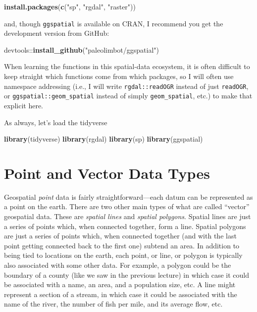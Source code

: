 \documentclass[]{book}
\newenvironment{Shaded}{\begin{snugshade}}{\end{snugshade}}
\newcommand{\KeywordTok}[1]{\textcolor[rgb]{0.13,0.29,0.53}{\textbf{{#1}}}}
\newcommand{\StringTok}[1]{\textcolor[rgb]{0.31,0.60,0.02}{{#1}}}
\newcommand{\NormalTok}[1]{{#1}}
\theoremstyle{definition}
\theoremstyle{definition}
\theoremstyle{remark}
\begin{document}
\begin{Shaded}
\begin{Highlighting}[]
\KeywordTok{install.packages}\NormalTok{(}\KeywordTok{c}\NormalTok{(}\StringTok{"sp"}\NormalTok{, }\StringTok{"rgdal"}\NormalTok{, }\StringTok{"raster"}\NormalTok{))}
\end{Highlighting}
\end{Shaded}

and, though \texttt{ggspatial} is available on CRAN, I recommend you get
the development version from GitHub:

\begin{Shaded}
\begin{Highlighting}[]
\NormalTok{devtools::}\KeywordTok{install_github}\NormalTok{(}\StringTok{"paleolimbot/ggspatial"}\NormalTok{)}
\end{Highlighting}
\end{Shaded}

When learning the functions in this spatial-data ecosystem, it is often
difficult to keep straight which functions come from which packages, so
I will often use namespace addressing (i.e., I will write
\texttt{rgdal::readOGR} instead of just \texttt{readOGR}, or
\texttt{ggspatial::geom\_spatial} instead of simply
\texttt{geom\_spatial}, etc.) to make that explicit here.

As always, let's load the tidyverse

\begin{Shaded}
\begin{Highlighting}[]
\KeywordTok{library}\NormalTok{(tidyverse)}
\KeywordTok{library}\NormalTok{(rgdal)}
\KeywordTok{library}\NormalTok{(sp)}
\KeywordTok{library}\NormalTok{(ggspatial)}
\end{Highlighting}
\end{Shaded}

\section{Point and Vector Data Types}\label{point-and-vector-data-types}

Geospatial \emph{point} data is fairly straightforward---each datum can
be represented as a point on the earth. There are two other main types
of what are called ``vector'' geospatial data. These are \emph{spatial
lines} and \emph{spatial polygons}. Spatial lines are just a series of
points which, when connected together, form a line. Spatial polygons are
just a series of points which, when connected together (and with the
last point getting connected back to the first one) subtend an area. In
addition to being tied to locations on the earth, each point, or line,
or polygon is typically also associated with some other data. For
example, a polygon could be the boundary of a county (like we saw in the
previous lecture) in which case it could be associated with a name, an
area, and a population size, etc. A line might represent a section of a
stream, in which case it could be associated with the name of the river,
the number of fish per mile, and its average flow, etc.
\end{document}
